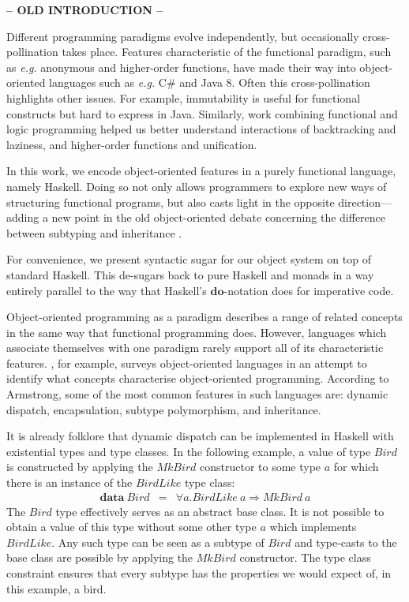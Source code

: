 \textbf{-- OLD INTRODUCTION --}

Different programming paradigms evolve independently, but occasionally cross-pollination takes place. Features characteristic of the functional paradigm, such as \emph{e.g.} anonymous and higher-order functions, have made their way into object-oriented languages such as \emph{e.g.} C\# and Java 8. Often this cross-pollination highlights other issues. For example, immutability is useful for functional constructs but hard to express in Java. Similarly, work combining functional and logic programming \citep{nadathur1988overview,hanus2006curry,somogyi1996execution} helped us better understand interactions of backtracking and laziness, and higher-order functions and unification.

In this work, we encode object-oriented features in a purely functional language, namely Haskell. Doing so not only allows programmers to explore new ways of structuring functional programs, but also casts light in the opposite direction---adding a new point in the old object-oriented debate concerning the difference between subtyping and inheritance \cite{cook1989inheritance}. 

For convenience, we present syntactic sugar for our object system on top of standard Haskell. This de-sugars back to pure Haskell and monads in a way entirely
parallel to the way that Haskell's $\mathbf{do}$-notation does for imperative code.

Object-oriented programming as a paradigm describes a range of related concepts in the same way that functional programming does. However, languages which associate themselves with one paradigm rarely support all of its characteristic features. \citet{armstrong2006quarks}, for example, surveys object-oriented languages in an attempt to identify what concepts characterise object-oriented programming. According to Armstrong, some of the most common features in such languages are: dynamic dispatch, encapsulation, subtype polymorphism, and inheritance. 

It is already folklore that dynamic dispatch can be implemented in Haskell with existential types and type classes. In the following example, a value of type $\mathit{Bird}$ is constructed by applying the $\mathit{MkBird}$ constructor to some type $a$ for which there is an instance of the $\mathit{BirdLike}$ type class:
\begin{displaymath}
\begin{array}{lcl}
\mathbf{data}~\mathit{Bird} & = & \forall a. \mathit{BirdLike}~a \Rightarrow \mathit{MkBird}~a
\end{array}
\end{displaymath}
The $\mathit{Bird}$ type effectively serves as an abstract base class. It is not possible to obtain a value of this type without some other type $a$ which implements $\mathit{BirdLike}$. Any such type can be seen as a subtype of $\mathit{Bird}$ and type-casts to the base class are possible by applying the $\mathit{MkBird}$ constructor. The type class constraint ensures that every subtype has the properties we would expect of, in this example, a bird.


